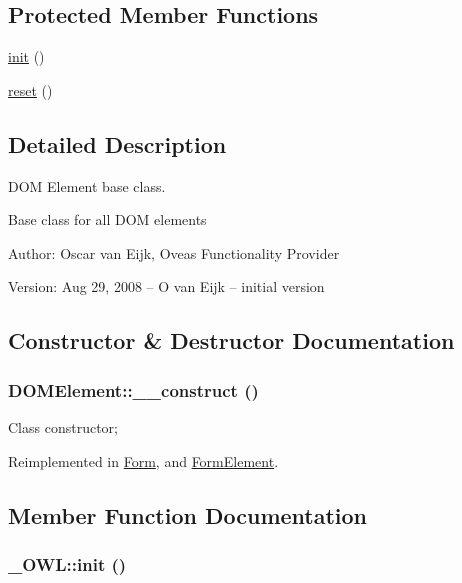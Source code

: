 \subsection*{Protected Member Functions}
\begin{CompactItemize}
\item 
\hyperlink{class__OWL_e0ef3ded56e8a6b34b6461e5a721cd3e}{init} ()
\item 
\hyperlink{class__OWL_2f2a042bcf31965194c03033df0edc9b}{reset} ()
\end{CompactItemize}


\subsection{Detailed Description}
DOM Element base class. 

Base class for all DOM elements \begin{Desc}
\item[Author:]Oscar van Eijk, Oveas Functionality Provider \end{Desc}
\begin{Desc}
\item[Version:]Aug 29, 2008 -- O van Eijk -- initial version \end{Desc}


\subsection{Constructor \& Destructor Documentation}
\hypertarget{classDOMElement_309ad8e22a59ba874187929c4c851be3}{
\subsubsection{\setlength{\rightskip}{0pt plus 5cm}DOMElement::\_\-\_\-construct ()}}
\label{classDOMElement_309ad8e22a59ba874187929c4c851be3}


Class constructor; 

Reimplemented in \hyperlink{classForm_47e154733dffd6b61a74f4d2f6498f8c}{Form}, and \hyperlink{classFormElement_f5ecddb99f71fcd2a7b52b2dbcd4c4c5}{FormElement}.

\subsection{Member Function Documentation}
\hypertarget{class__OWL_e0ef3ded56e8a6b34b6461e5a721cd3e}{
\subsubsection{\setlength{\rightskip}{0pt plus 5cm}\_\-OWL::init ()}}
\label{class__OWL_e0ef3ded56e8a6b34b6461e5a721cd3e}


